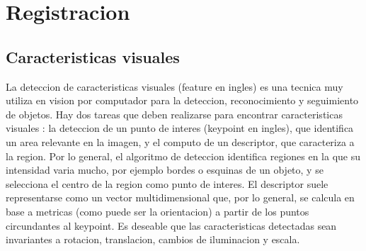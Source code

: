 \chapter{Registracion}

\section{Caracteristicas visuales}

La deteccion de caracteristicas visuales (feature en ingles) es una tecnica muy utiliza en vision por computador para la deteccion, reconocimiento y seguimiento de objetos. Hay dos tareas que deben realizarse para encontrar caracteristicas visuales : la deteccion de un punto de interes (keypoint en ingles), que identifica un area relevante en la imagen, y el computo de un descriptor, que caracteriza a la region. Por lo general, el algoritmo de deteccion identifica regiones en la que su intensidad varia mucho, por ejemplo bordes o esquinas de un objeto, y se selecciona el centro de la region como punto de interes. El descriptor suele representarse como un vector multidimensional que, por lo general, se calcula en base a metricas (como puede ser la orientacion) a partir de los puntos circundantes al keypoint. Es deseable que las caracteristicas detectadas sean invariantes a rotacion, translacion, cambios de iluminacion y escala.


